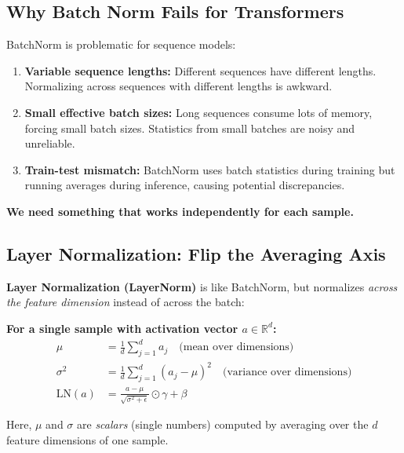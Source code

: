 \documentclass{article}
\begin{document}
\subsection{Why Batch Norm Fails for Transformers}

BatchNorm is problematic for sequence models:

\begin{enumerate}
\item \textbf{Variable sequence lengths:} Different sequences have different lengths. Normalizing across sequences with different lengths is awkward.

\item \textbf{Small effective batch sizes:} Long sequences consume lots of memory, forcing small batch sizes. Statistics from small batches are noisy and unreliable.

\item \textbf{Train-test mismatch:} BatchNorm uses batch statistics during training but running averages during inference, causing potential discrepancies.
\end{enumerate}

\textbf{We need something that works independently for each sample.}

\subsection{Layer Normalization: Flip the Averaging Axis}

\textbf{Layer Normalization (LayerNorm)} is like BatchNorm, but normalizes \textit{across the feature dimension} instead of across the batch:

\textbf{For a single sample with activation vector $a \in \mathbb{R}^d$:}
\begin{align}
\mu &= \frac{1}{d} \sum_{j=1}^d a_j \quad \text{(mean over dimensions)} \\
\sigma^2 &= \frac{1}{d} \sum_{j=1}^d (a_j - \mu)^2 \quad \text{(variance over dimensions)} \\
\text{LN}(a) &= \frac{a - \mu}{\sqrt{\sigma^2 + \epsilon}} \odot \gamma + \beta
\end{align}

Here, $\mu$ and $\sigma$ are \textit{scalars} (single numbers) computed by averaging over the $d$ feature dimensions of one sample.
\end{document}
